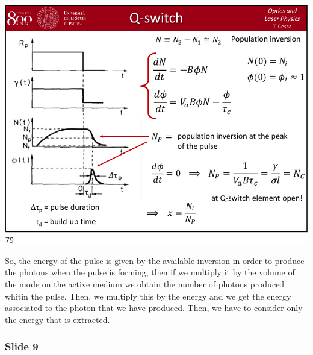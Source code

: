 \documentclass[../main/main.tex]{subfiles}
\begin{document}
\begin{minipage}[]{0.5\linewidth}
\centering
\includegraphics[page=8,width=1\textwidth]{../lessons/pdf_file/15_lecture.pdf}
\end{minipage}
\hspace{0.3cm}\vspace{0.3cm}
\begin{minipage}[c]{0.47\linewidth}

So, the energy of the pulse is given by the available inversion in order to produce the photons when the pulse is forming, then if we multiply it by the volume of the mode on the active medium we obtain the number of photons produced whitin the pulse. Then, we multiply this by the energy and we get the energy associated to the photon that we have produced. Then, we have to consider only the energy that is extracted.

\end{minipage}

\subsubsection*{Slide 9}
\end{document}
